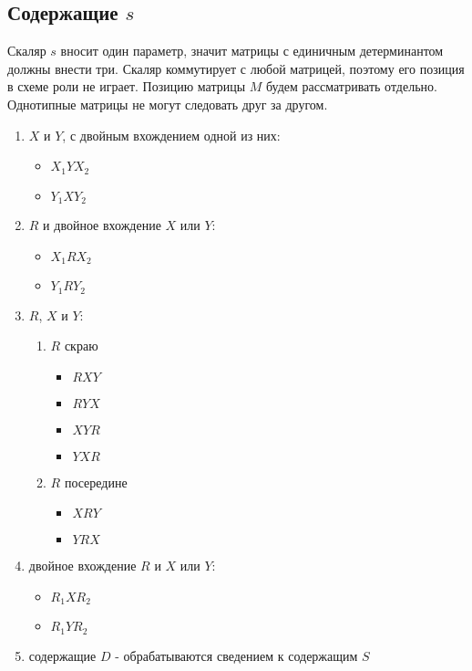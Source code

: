 \subsection{Содержащие $s$}

Скаляр $s$ вносит один параметр, значит матрицы с единичным детерминантом должны внести три.
Скаляр коммутирует с любой матрицей, поэтому его позиция в схеме роли не играет.
Позицию матрицы $M$ будем рассматривать отдельно.
Однотипные матрицы не могут следовать друг за другом.

\begin{enumerate}
	\item $X$ и $Y$, с двойным вхождением одной из них:
	\begin{itemize}
		\item $X_1YX_2$
		\item $Y_1XY_2$
	\end{itemize}
	\item $R$ и двойное вхождение $X$ или $Y$:
	\begin{itemize}
		\item $X_1RX_2$
		\item $Y_1RY_2$
	\end{itemize}
	\item $R$, $X$ и $Y$:
	\begin{enumerate}
		\item $R$ скраю
		\begin{itemize}
			\item $RXY$
			\item $RYX$
			\item $XYR$
			\item $YXR$
		\end{itemize}
		\item $R$ посередине
		\begin{itemize}
			\item $XRY$
			\item $YRX$
		\end{itemize}
	\end{enumerate}
	\item двойное вхождение $R$ и $X$ или $Y$:
	\begin{itemize}
		\item $R_1XR_2$
		\item $R_1YR_2$
	\end{itemize}
	\item содержащие $D$ - обрабатываются сведением к содержащим $S$
\end{enumerate}

